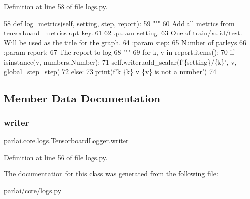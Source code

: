 Definition at line 58 of file logs.\+py.


\begin{DoxyCode}
58     \textcolor{keyword}{def }log\_metrics(self, setting, step, report):
59         \textcolor{stringliteral}{"""}
60 \textcolor{stringliteral}{        Add all metrics from tensorboard\_metrics opt key.}
61 \textcolor{stringliteral}{}
62 \textcolor{stringliteral}{        :param setting:}
63 \textcolor{stringliteral}{            One of train/valid/test. Will be used as the title for the graph.}
64 \textcolor{stringliteral}{        :param step:}
65 \textcolor{stringliteral}{            Number of parleys}
66 \textcolor{stringliteral}{        :param report:}
67 \textcolor{stringliteral}{            The report to log}
68 \textcolor{stringliteral}{        """}
69         \textcolor{keywordflow}{for} k, v \textcolor{keywordflow}{in} report.items():
70             \textcolor{keywordflow}{if} isinstance(v, numbers.Number):
71                 self.writer.add\_scalar(f\textcolor{stringliteral}{'\{setting\}/\{k\}'}, v, global\_step=step)
72             \textcolor{keywordflow}{else}:
73                 print(f\textcolor{stringliteral}{'k \{k\} v \{v\} is not a number'})
74 \end{DoxyCode}


\subsection{Member Data Documentation}
\mbox{\label{classparlai_1_1core_1_1logs_1_1TensorboardLogger_afc71d93e950d01b95fc824d347907a58}} 
\subsubsection{\texorpdfstring{writer}{writer}}
{\footnotesize\ttfamily parlai.\+core.\+logs.\+Tensorboard\+Logger.\+writer}



Definition at line 56 of file logs.\+py.



The documentation for this class was generated from the following file\+:\begin{DoxyCompactItemize}
\item 
parlai/core/\hyperlink{logs_8py}{logs.\+py}\end{DoxyCompactItemize}
